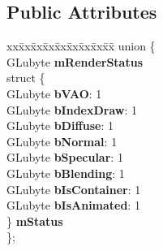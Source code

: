 \subsection*{Public Attributes}
\begin{DoxyCompactItemize}
\item 
\mbox{\label{structflw_1_1flf_1_1RenderItem_a25b772473a14ebee85b503ec748518d8}} 
\begin{tabbing}
xx\=xx\=xx\=xx\=xx\=xx\=xx\=xx\=xx\=\kill
union \{\\
\>GLubyte {\bfseries mRenderStatus}\\
\>struct \{\\
\>\>GLubyte {\bfseries bVAO}: 1\\
\>\>GLubyte {\bfseries bIndexDraw}: 1\\
\>\>GLubyte {\bfseries bDiffuse}: 1\\
\>\>GLubyte {\bfseries bNormal}: 1\\
\>\>GLubyte {\bfseries bSpecular}: 1\\
\>\>GLubyte {\bfseries bBlending}: 1\\
\>\>GLubyte {\bfseries bIsContainer}: 1\\
\>\>GLubyte {\bfseries bIsAnimated}: 1\\
\>\} {\bfseries mStatus}\\
\}; \\


\end{tabbing}
\end{DoxyCompactItemize}
